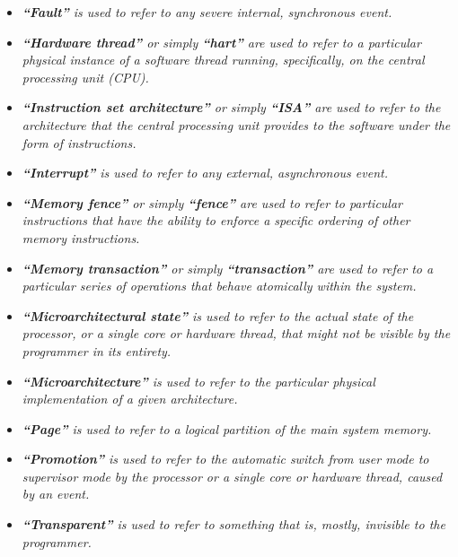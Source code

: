 \documentclass{article}
\begin{document}
\begin{itemize}
                \item \textit{\textbf{``Fault''} is used to refer to any severe internal, synchronous event.}

                \item \textit{\textbf{``Hardware thread''} or simply \textbf{``hart''} are used to refer to a particular physical instance of a software thread running, specifically, on the central processing unit (CPU).}

                \item \textit{\textbf{``Instruction set architecture''} or simply \textbf{``ISA''} are used to refer to the architecture that the central processing unit provides to the software under the form of instructions.}

                \item \textit{\textbf{``Interrupt''} is used to refer to any external, asynchronous event.}

                \item \textit{\textbf{``Memory fence''} or simply \textbf{``fence''} are used to refer to particular instructions that have the ability to enforce a specific ordering of other memory instructions.}

                \item \textit{\textbf{``Memory transaction''} or simply \textbf{``transaction''} are used to refer to a particular series of operations that behave atomically within the system.}

                \item \textit{\textbf{``Microarchitectural state''} is used to refer to the actual state of the processor, or a single core or hardware thread, that might not be visible by the programmer in its entirety.}

                \item \textit{\textbf{``Microarchitecture''} is used to refer to the particular physical implementation of a given architecture.}

                \item \textit{\textbf{``Page''} is used to refer to a logical partition of the main system memory.}

                \item \textit{\textbf{``Promotion''} is used to refer to the automatic switch from user mode to supervisor mode by the processor or a single core or hardware thread, caused by an event.}

                \item \textit{\textbf{``Transparent''} is used to refer to something that is, mostly, invisible to the programmer.}


\end{itemize}
\end{document}
